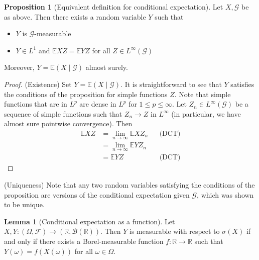 \documentclass[parskip=full]{article}
\theoremstyle{definition}
\newtheorem{lemma}{Lemma}[theorem]
\newtheorem*{proposition}{Proposition}
\newcommand{\R}{\mathbb{R}}
\newcommand{\F}{\mathcal{F}}
\newcommand{\B}{\mathcal{B}}
\newcommand{\1}{\mathbbm{1}}
\newcommand{\E}{\mathbb{E}}
\begin{document}
\begin{proposition}[Equivalent definition for conditional expectation]
Let $X, \mathcal{G}$ be as above. Then there exists a random variable $Y$ such that
\begin{itemize}
    \item $Y$ is $\mathcal{G}$-measurable
    \item $Y \in L^1$ and $\E X Z = \E Y Z$ for all $Z \in L^\infty(\mathcal{G})$ 
\end{itemize}

Moreover, $Y = \E(X \mid \mathcal{G})$ almost surely.
\end{proposition}

\begin{proof}
(Existence)
Set $Y = \E(X \mid \mathcal{G})$. It is straightforward to see that $Y$ satisfies the conditions of the proposition for simple functions $Z$. Note that simple functions that are in $L^p$ are dense in $L^p$ for $1 \leq p \leq \infty$. Let $Z_n \in L^\infty(\mathcal{G})$ be a sequence of simple functions such that $Z_n \to Z$ in $L^\infty$ (in particular, we have almost sure pointwise convergence). Then
\begin{align*}
    \E X Z &= \lim_{n \to \infty} \E X Z_n &&\text{(DCT)}\\
    &= \lim_{n \to \infty} \E Y Z_n\\
    &= \E Y Z &&\text{(DCT)}
\end{align*}
\end{proof}

(Uniqueness) Note that any two random variables satisfying the conditions of the proposition are versions of the conditional expectation given $\mathcal{G}$, which was shown to be unique.

\begin{lemma}[Conditional expectation as a function]
Let $X, Y: (\Omega, \F) \to (\R, \B(\R))$. Then $Y$ is measurable with respect to $\sigma(X)$ if and only if there exists a Borel-measurable function $f: \R \to \R$ such that $Y(\omega) = f(X(\omega))$ for all $\omega \in \Omega$.
\end{lemma}
\end{document}

